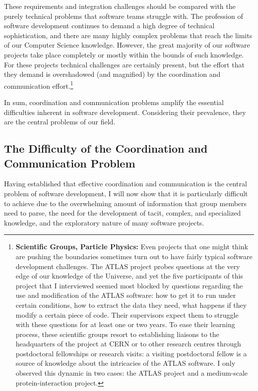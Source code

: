 These requirements and integration challenges should be compared with the purely technical problems that software teams struggle with. The profession of software development continues to demand a high degree of technical sophistication, and there are many highly complex problems that reach the limits of our Computer Science knowledge. However, the great majority of our software projects take place completely or mostly within the bounds of such knowledge. For these projects technical challenges are certainly present, but the effort that they demand is overshadowed (and magnified) by the coordination and communication effort.\footnote{\textbf{Scientific Groups, Particle Physics:} Even projects that one might think are pushing the boundaries sometimes turn out to have fairly typical software development challenges. The ATLAS project probes questions at the very edge of our knowledge of the Universe, and yet the five participants of this project that I interviewed seemed most blocked by questions regarding the use and modification of the ATLAS software: how to get it to run under certain conditions, how to extract the data they need, what happens if they modify a certain piece of code. Their supervisors expect them to struggle with these questions for at least one or two years. To ease their learning process, these scientific groups resort to establishing liaisons to the headquarters of the project at CERN or to other research centres through postdoctoral fellowships or research visits: a visiting postdoctoral fellow is a source of knowledge about the intricacies of the ATLAS software. I only observed this dynamic in two cases: the ATLAS project and a medium-scale protein-interaction project.}

In sum, coordination and communication problems amplify the essential difficulties inherent in software development. Considering their prevalence, they are the central problems of our field.


\subsection{The Difficulty of the Coordination and Communication Problem}

Having established that effective coordination and communication is the central problem of software development, I will now show that it is particularly difficult to achieve due to the overwhelming amount of information that group members need to parse, the need for the development of tacit, complex, and specialized knowledge, and the exploratory nature of many software projects.

